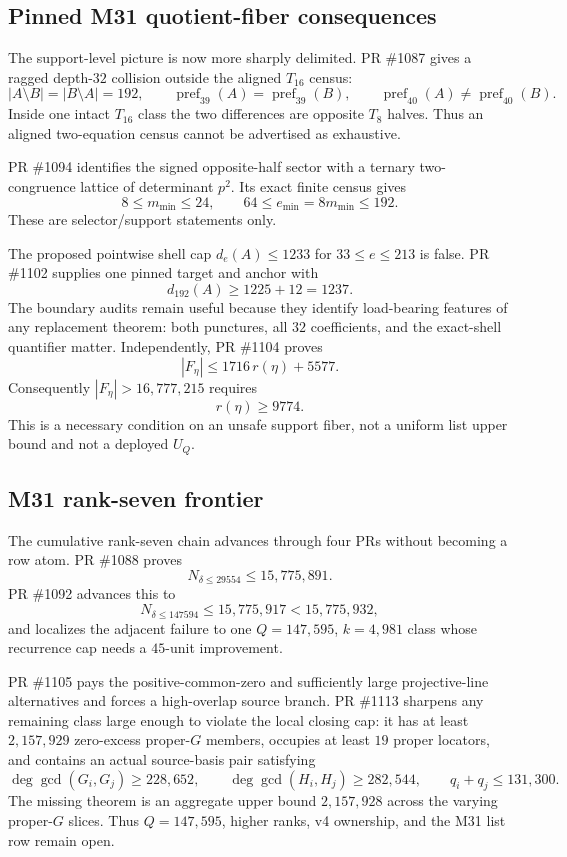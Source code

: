 \documentclass[11pt]{article}
\begin{document}
\subsection{Pinned M31 quotient-fiber consequences}

The support-level picture is now more sharply delimited.  PR \#1087 gives a
ragged depth-\(32\) collision outside the aligned \(T_{16}\) census:
\[
  |A\setminus B|=|B\setminus A|=192,\qquad
  \operatorname{pref}_{39}(A)=\operatorname{pref}_{39}(B),
  \qquad
  \operatorname{pref}_{40}(A)\ne\operatorname{pref}_{40}(B).
\]
Inside one intact \(T_{16}\) class the two differences are opposite \(T_8\)
halves.  Thus an aligned two-equation census cannot be advertised as
exhaustive.

PR \#1094 identifies the signed opposite-half sector with a ternary
two-congruence lattice of determinant \(p^2\).  Its exact finite census gives
\[
  8\le m_{\min}\le24,
  \qquad
  64\le e_{\min}=8m_{\min}\le192.
\]
These are selector/support statements only.

The proposed pointwise shell cap \(d_e(A)\le1233\) for
\(33\le e\le213\) is false.  PR \#1102 supplies one pinned target and anchor
with
\[
  d_{192}(A)\ge1225+12=1237.
\]
The boundary audits remain useful because they identify load-bearing features
of any replacement theorem: both punctures, all \(32\) coefficients, and the
exact-shell quantifier matter.  Independently, PR \#1104 proves
\[
  |F_\eta|\le1716\,r(\eta)+5577.
\]
Consequently \(|F_\eta|>16{,}777{,}215\) requires
\[
  r(\eta)\ge9774.
\]
This is a necessary condition on an unsafe support fiber, not a uniform list
upper bound and not a deployed \(U_Q\).

\subsection{M31 rank-seven frontier}

The cumulative rank-seven chain advances through four PRs without becoming a
row atom.  PR \#1088 proves
\[
  N_{\delta\le29554}\le15{,}775{,}891.
\]
PR \#1092 advances this to
\[
  N_{\delta\le147594}\le15{,}775{,}917
  <15{,}775{,}932,
\]
and localizes the adjacent failure to one \(Q=147{,}595\),
\(k=4{,}981\) class whose recurrence cap needs a \(45\)-unit improvement.

PR \#1105 pays the positive-common-zero and sufficiently large
projective-line alternatives and forces a high-overlap source branch.
PR \#1113 sharpens any remaining class large enough to violate the local
closing cap: it has at least \(2{,}157{,}929\) zero-excess proper-\(G\)
members, occupies at least \(19\) proper locators, and contains an actual
source-basis pair satisfying
\[
 \deg\gcd(G_i,G_j)\ge228{,}652,\qquad
 \deg\gcd(H_i,H_j)\ge282{,}544,\qquad
 q_i+q_j\le131{,}300.
\]
The missing theorem is an aggregate upper bound \(2{,}157{,}928\) across the
varying proper-\(G\) slices.  Thus \(Q=147{,}595\), higher ranks, v4 ownership,
and the M31 list row remain open.
\end{document}

